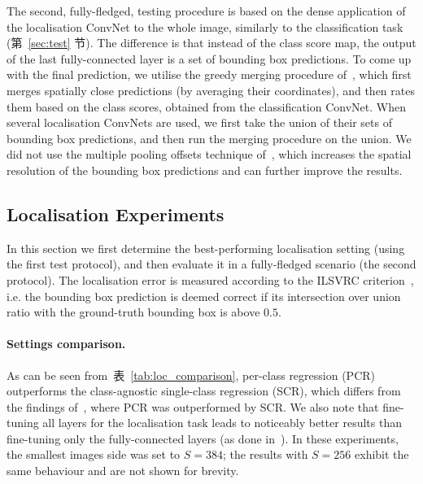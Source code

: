 \documentclass{article} %
\makeatletter
\newcommand{\tblref}[1]{表~\ref{#1}}
\newcommand{\sref}[1]{第~\ref{#1} 节}
\newcommand*{\ie}{i.e.\@\xspace}
\makeatother
\begin{document}
The second, fully-fledged, testing procedure is based on the dense application of the localisation ConvNet to the whole image, similarly to the classification task (\sref{sec:test}).
The difference is that instead of the class score map, the output of the last fully-connected layer is a set of bounding box predictions.
To come up with the final prediction, we utilise the greedy merging procedure of~\citet{Sermanet14}, which first merges spatially close predictions (by averaging their coordinates), and then rates them
based on the class scores, obtained from the classification ConvNet. 
When several localisation ConvNets are used, we first take the union of their sets of bounding box predictions, and then run the merging procedure on the union.
We did not use the multiple pooling offsets technique of~\citet{Sermanet14}, which increases the spatial resolution of the bounding box predictions 
and can further improve the results.

\subsection{Localisation Experiments}
\label{sec:loc_eval}

In this section we first determine the best-performing localisation setting (using the first test protocol),
and then evaluate it in a fully-fledged scenario (the second protocol).
The localisation error is measured according to the ILSVRC criterion~\citep{Russakovsky14}, \ie the bounding box prediction is deemed correct if its intersection over union ratio with the ground-truth
bounding box is above $0.5$.

\paragraph{Settings comparison.}
As can be seen from~\tblref{tab:loc_comparison}, per-class regression (PCR) outperforms the class-agnostic single-class regression (SCR), which differs from the findings of~\citet{Sermanet14},
where PCR was outperformed by SCR. We also note that fine-tuning all layers for the localisation task leads to noticeably better results than fine-tuning only the fully-connected layers 
(as done in~\citep{Sermanet14}). In these experiments, the smallest images side was set to $S=384$; the results with $S=256$ exhibit the same behaviour and are not shown for brevity.
\end{document}
